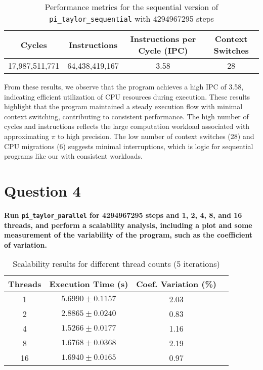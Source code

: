\documentclass{article}
\begin{document}
\begin{table}[h!]
    \centering
    \begin{tabular}{|c|c|c|c|}
    \hline
    \textbf{Cycles} & \textbf{Instructions} & \textbf{Instructions per Cycle (IPC)} & \textbf{Context Switches} \\
    \hline
    17,987,511,771 & 64,438,419,167 & 3.58 & 28 \\
    \hline
    \end{tabular}
    \caption{Performance metrics for the sequential version of \texttt{pi\_taylor\_sequential} with 4294967295 steps}
    \label{table:sequential_perf_metrics}
\end{table}


From these results, we observe that the program achieves a high IPC of 3.58, indicating efficient utilization of CPU resources during execution. These results highlight that the program maintained a steady execution flow with minimal context switching, contributing to consistent performance. The high number of cycles and instructions reflects the large computation workload associated with approximating \(\pi\) to high precision. The low number of context switches (28) and CPU migrations (6) suggests minimal interruptions, which is logic for sequential programs like our with consistent workloads. 

\section*{Question 4}

\textbf{Run \texttt{pi\_taylor\_parallel} for 4294967295 steps and 1, 2, 4, 8, and 16 threads, and perform a scalability analysis, including a plot and some measurement of the variability of the program, such as the coefficient of variation.}

\begin{table}[h!]
\centering
\begin{tabular}{|c|c|c|c|}
\hline
\textbf{Threads} & \textbf{Execution Time (s)} & \textbf{Coef. Variation (\%)} \\
\hline
1 & \(5.6990 \pm  0.1157\) & 2.03 \\
2 & \(2.8865 \pm  0.0240\) & 0.83 \\
4 & \(1.5266 \pm  0.0177\)& 1.16 \\
8 & \(1.6768 \pm  0.0368\)& 2.19 \\
16 & \(1.6940 \pm  0.0165\) & 0.97 \\
\hline
\end{tabular}
\caption{Scalability results for different thread counts (5 iterations)}
\label{table:scalability_results}
\end{table}
\end{document}

